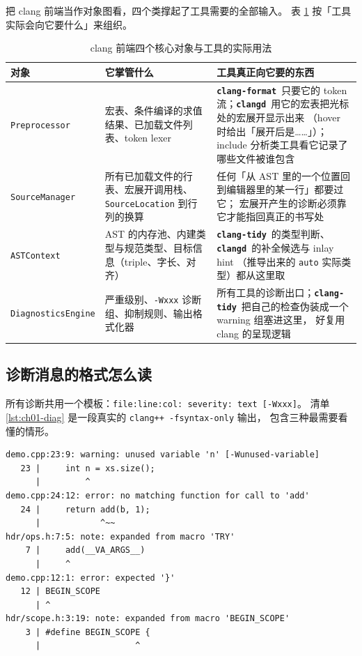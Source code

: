 \documentclass[12pt,a4paper,fontset=fandol]{ctexbook}
\newcommand{\Tp}[1]{\texttt{#1}}
\newcommand{\Lib}[1]{\textbf{\texttt{#1}}}
\newcommand{\Tidy}{\Lib{clang-tidy}}
\newcommand{\Fmt}{\Lib{clang-format}}
\newcommand{\CD}{\Lib{clangd}}
\begin{document}
把 clang 前端当作对象图看，四个类撑起了工具需要的全部输入。
表 \ref{tab:ch01-objects} 按「工具实际会向它要什么」来组织。

\begin{table}[htbp]
\centering
\caption{clang 前端四个核心对象与工具的实际用法}
\label{tab:ch01-objects}
\begin{tabular}{@{}>{\raggedright\arraybackslash\small}p{}
                 >{\raggedright\arraybackslash\small}p{}
                 >{\raggedright\arraybackslash\small}p{}@{}}
\toprule
对象 & 它掌管什么 & 工具真正向它要的东西 \\
\midrule
\texttt{Preprocessor} &
  宏表、条件编译的求值结果、已加载文件列表、token lexer &
  \Fmt\ 只要它的 token 流；\CD\ 用它的宏表把光标处的宏展开显示出来
  （hover 时给出「展开后是……」）；include 分析类工具看它记录了
  哪些文件被谁包含 \\
\texttt{SourceManager} &
  所有已加载文件的行表、宏展开调用栈、\texttt{Source\allowbreak Location}
  到行列的换算 &
  任何「从 AST 里的一个位置回到编辑器里的某一行」都要过它；
  宏展开产生的诊断必须靠它才能指回真正的书写处 \\
\texttt{ASTContext} &
  AST 的内存池、内建类型与规范类型、目标信息（triple、字长、对齐） &
  \Tidy\ 的类型判断、\CD\ 的补全候选与 inlay hint
  （推导出来的 \Tp{auto} 实际类型）都从这里取 \\
\texttt{Diagnostic\allowbreak sEngine} &
  严重级别、\texttt{-Wxxx} 诊断组、抑制规则、输出格式化器 &
  所有工具的诊断出口；\Tidy\ 把自己的检查伪装成一个 warning 组塞进这里，
  好复用 clang 的呈现逻辑 \\
\bottomrule
\end{tabular}
\end{table}

\subsection*{诊断消息的格式怎么读}

所有诊断共用一个模板：\texttt{file:line:col: severity: text [-Wxxx]}。
清单 \ref{lst:ch01-diag} 是一段真实的 \texttt{clang++ -fsyntax-only} 输出，
包含三种最需要看懂的情形。

\begin{lstlisting}[style=shellstyle,caption={一段诊断输出：范围标记、宏展开链与目标文件},label={lst:ch01-diag}]
demo.cpp:23:9: warning: unused variable 'n' [-Wunused-variable]
   23 |     int n = xs.size();
      |         ^
demo.cpp:24:12: error: no matching function for call to 'add'
   24 |     return add(b, 1);
      |            ^~~
hdr/ops.h:7:5: note: expanded from macro 'TRY'
    7 |     add(__VA_ARGS__)
      |     ^
demo.cpp:12:1: error: expected '}'
   12 | BEGIN_SCOPE
      | ^
hdr/scope.h:3:19: note: expanded from macro 'BEGIN_SCOPE'
    3 | #define BEGIN_SCOPE {
      |                   ^
\end{lstlisting}
\end{document}

